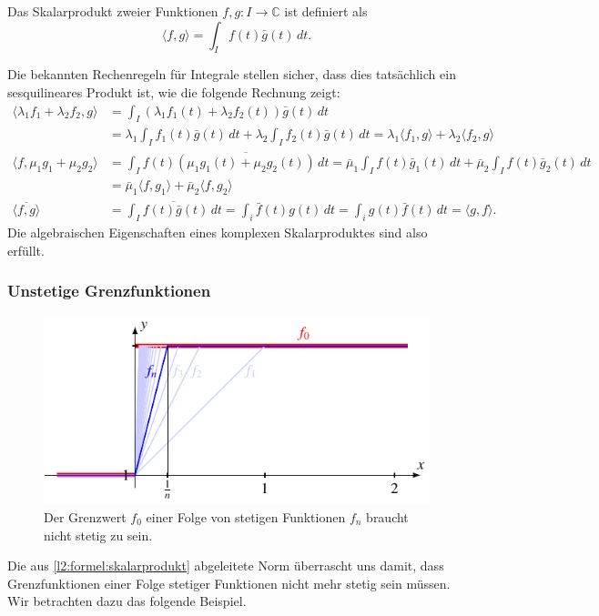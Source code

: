 \begin{definition}
\label{l2:definition:skalarprodukt}
%
Das Skalarprodukt zweier Funktionen $f,g\colon I\to\mathbb C$ ist definiert
als
\begin{equation}
\langle f,g\rangle
=
\int_I f(t) \bar{g}(t)\,dt.
\label{l2:formel:skalarprodukt}
\end{equation}
\end{definition}

Die bekannten Rechenregeln für Integrale stellen sicher, dass dies
tatsächlich ein sesquilineares Produkt ist, wie die folgende Rechnung
zeigt:
\begin{align*}
\langle \lambda_1 f_1+\lambda_2 f_2,g\rangle
&=
\int_I (\lambda_1 f_1(t) + \lambda_2 f_2(t))\bar{g}(t)\,dt
\\
&=
\lambda_1 \int_I f_1(t) \bar{g}(t)\,dt + \lambda_2 \int_I f_2(t)\bar{g}(t)\,dt
= \lambda_1 \langle f_1,g\rangle + \lambda_2 \langle f_2,g\rangle
\\
\langle f,\mu_1 g_1 + \mu_2 g_2\rangle
&=
\int_I f(t) \overline{(\mu_1 g_1(t) + \mu_2 g_2(t))}\,dt
=
\bar{\mu}_1 \int_I f(t) \bar{g}_1(t)\,dt
+
\bar{\mu}_2 \int_I f(t) \bar{g}_2(t)\,dt
\\
&=
\bar{\mu}_1 \langle f,g_1\rangle
+
\bar{\mu}_2 \langle f,g_2\rangle
\\
\overline{
\langle f,g\rangle
}
&=
\overline{ \int_I f(t)\bar{g}(t)\,dt}
=
\int_i \bar{f}(t) g(t)\,dt
=
\int_i g(t) \bar{f}(t)\,dt
=
\langle g,f\rangle.
\end{align*}
Die algebraischen Eigenschaften eines komplexen Skalarproduktes sind
also erfüllt.

\subsubsection{Unstetige Grenzfunktionen}
\begin{figure}
\centering
\includegraphics{chapters/2-fourier/images/lim.pdf}
\caption{Der Grenzwert $f_0$ einer Folge von stetigen Funktionen $f_n$
braucht nicht stetig zu sein.
\label{fourier:grenzwertunstetig}}
\end{figure}
Die aus \eqref{l2:formel:skalarprodukt} abgeleitete Norm überrascht uns
damit, dass Grenzfunktionen einer Folge stetiger Funktionen nicht mehr
stetig sein müssen.
Wir betrachten dazu das folgende Beispiel.

